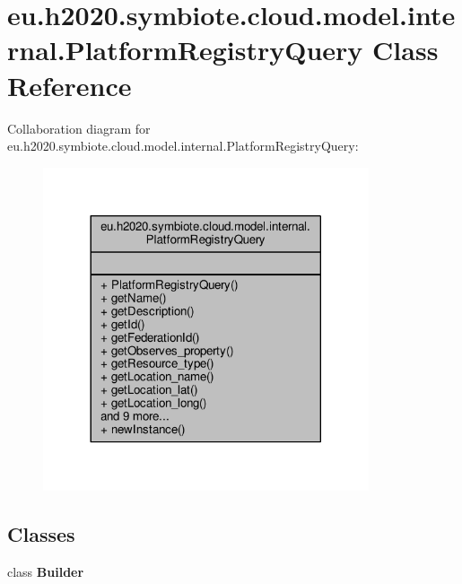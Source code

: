 \hypertarget{classeu_1_1h2020_1_1symbiote_1_1cloud_1_1model_1_1internal_1_1PlatformRegistryQuery}{}\section{eu.\+h2020.\+symbiote.\+cloud.\+model.\+internal.\+Platform\+Registry\+Query Class Reference}
\label{classeu_1_1h2020_1_1symbiote_1_1cloud_1_1model_1_1internal_1_1PlatformRegistryQuery}


Collaboration diagram for eu.\+h2020.\+symbiote.\+cloud.\+model.\+internal.\+Platform\+Registry\+Query\+:\nopagebreak
\begin{figure}[H]
\begin{center}
\leavevmode
\includegraphics[width=272pt]{classeu_1_1h2020_1_1symbiote_1_1cloud_1_1model_1_1internal_1_1PlatformRegistryQuery__coll__graph}
\end{center}
\end{figure}
\subsection*{Classes}
\begin{DoxyCompactItemize}
\item 
class {\bfseries Builder}
\end{DoxyCompactItemize}
